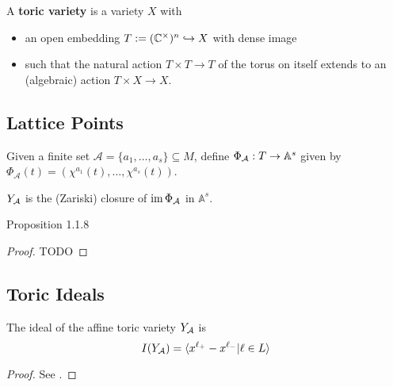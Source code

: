 \begin{definition}
  \label{1-1-3-aff-tor-var}
  \leanok

  A {\bf toric variety} is a variety $X$ with
  \begin{itemize}
    \item an open embedding $T := ({\mathbb C}^\times)^n \hookrightarrow X$ with dense image
    \item such that the natural action $T \times T \to T$ of the torus on itself extends to an (algebraic) action $T \times X \to X$.
  \end{itemize}
\end{definition}


\subsection{Lattice Points}


\begin{definition}
  \label{1-1-phiA}

  Given a finite set $\mathcal A = \{a_1, \dotsc, a_s\} \subseteq M$, define $\Phi_{\mathcal A} : T \to \mathbb A^s$ given by $\Phi_{\mathcal A} (t) = (\chi^{a_1} (t), \dotsc, \chi^{a_s} (t))$.
\end{definition}


\begin{definition}
  \label{1-1-7-ya}

  $Y_{\mathcal A}$ is the (Zariski) closure of $\operatorname{im} \Phi_{\mathcal A}$ in $\mathbb A^s$.
\end{definition}


\begin{proposition}
  \label{1-1-8-aff-tor-var-ya}

  Proposition 1.1.8
\end{proposition}
\begin{proof}

  TODO
\end{proof}


\subsection{Toric Ideals}


\begin{proposition}
  \label{1-1-9-ideal-ya}

  The ideal of the affine toric variety $Y_{\mathcal A}$ is
  \[
    I(Y_{\mathcal A}) = \langle x^{\ell_+} - x^{\ell_-} | \ell \in L\rangle
  \]
\end{proposition}
\begin{proof}
  \uses{}

  See \cite{Cox_2011}.
\end{proof}


